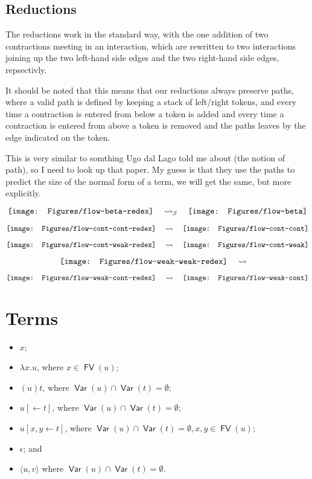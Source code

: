 \documentclass[11pt,a4paper]{article}
\theoremstyle{definition}
\theoremstyle{plain}
\theoremstyle{remark}
\begin{document}
\subsection{Reductions}

The reductions work in the standard way, with the one addition of two contractions meeting in an interaction, which are rewritten to two interactions joining up the two left-hand side edges and the two right-hand side edges, repsectivly.

It should be noted that this means that our reductions always preserve paths, where a valid path is defined by keeping a stack of left/right tokens, and every time a contraction is entered from below a token is added and every time a contraction is entered from above a token is removed and the paths leaves by the edge indicated on the token.

This is very similar to somthing Ugo dal Lago told me about (the notion of path), so I need to look up that paper. My guess is that they use the paths to predict the size of the normal form of a term, we will get the same, but more explicitly.

\[
\vcenter{\hbox{\texttt{[image: Figures/flow-beta-redex]}}}
\quad\rightsquigarrow_\beta\quad
\vcenter{\hbox{\texttt{[image: Figures/flow-beta]}}}
\]

\[
\vcenter{\hbox{\texttt{[image: Figures/flow-cont-cont-redex]}}}
\quad\rightsquigarrow\quad
\vcenter{\hbox{\texttt{[image: Figures/flow-cont-cont]}}}
\]

\[
\vcenter{\hbox{\texttt{[image: Figures/flow-cont-weak-redex]}}}
\quad\rightsquigarrow\quad
\vcenter{\hbox{\texttt{[image: Figures/flow-cont-weak]}}}
\]

\[
\vcenter{\hbox{\texttt{[image: Figures/flow-weak-weak-redex]}}}
\quad\rightsquigarrow\quad
\]

\[
\vcenter{\hbox{\texttt{[image: Figures/flow-weak-cont-redex]}}}
\quad\rightsquigarrow\quad
\vcenter{\hbox{\texttt{[image: Figures/flow-weak-cont]}}}
\]

\section{Terms}

\newcommand{\FV}{{\mathop{\mathsf{FV}}}}
\newcommand{\Var}{{\mathop{\mathsf{Var}}}}
\newcommand{\terpair}[2]{{\langle{#1},{#2}\rangle}}
\newcommand{\terdel}[1]{{[\leftarrow{#1}]}}
\newcommand{\terdup}[3]{{[{#1},{#2}\leftarrow{#3}]}}

\begin{itemize}
	\item $x$;
	\item $\lambda x.u$, where $x\in\FV(u)$;
	\item $(u)t$, where $\Var(u)\cap\Var(t)=\emptyset$;
	\item $u\terdel{t}$, where $\Var(u)\cap\Var(t)=\emptyset$;
	\item $u\terdup{x}{y}{t}$, where $\Var(u)\cap\Var(t)=\emptyset, x,y\in\FV(u)$;
	\item $\epsilon$; and
	\item $\terpair{u}{v}$ where $\Var(u)\cap\Var(t)=\emptyset$.
\end{itemize}
\end{document}
